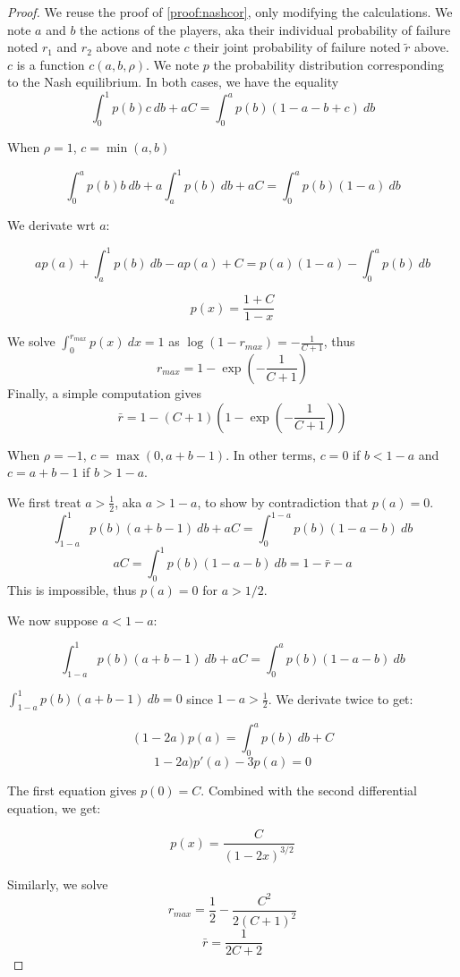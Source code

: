 \documentclass[preprint,12pt,authoryear,doubleblind]{elsarticle}
\theoremstyle{definition}
\begin{document}
\nashwithcor*
\begin{proof}
        We reuse the proof of \ref{proof:nashcor}, only modifying the calculations.
    We note $a$ and $b$ the actions of the players, aka their individual probability of failure noted $r_1$ and $r_2$ above and note $c$ their joint probability of failure noted $\tilde r$ above. $c$ is a function $c(a,b,\rho)$. We note $p$ the probability distribution corresponding to the Nash equilibrium.
    In both cases, we have the equality $$\int_0^1 p(b) c~db + a C = \int_0^a p(b)(1-a-b+c)~db$$

    When $\rho = 1$, $c = \min(a, b)$

    $$\int_0^a p(b) b~db + a \int_a^1 p(b)~db + a C = \int_0^a p(b)(1-a)~db$$

    We derivate wrt $a$:

    $$a p(a) + \int_a^1 p(b)~db - ap(a) + C = p(a)(1-a) - \int_0^a p(b)~db$$

    $$p(x) = \frac{1+C}{1-x}$$

    We solve $\int_0^{r_{max}} p(x)~dx=1$ as $\log(1-r_{max}) = -\frac{1}{C+1}$, thus
    $$r_{max} = 1 - \exp\left(-\frac{1}{C+1}\right)$$
    Finally, a simple computation gives $$\bar r = 1 - (C+1)\left(1-\exp\left(-\frac{1}{C+1}\right)\right)$$
    
    

    When $\rho = -1$, $c = \max(0, a+b-1)$. In other terms, $c=0$ if $b<1-a$ and $c=a+b-1$ if $b>1-a$.

    We first treat $a>\frac{1}{2}$, aka $a>1-a$, to show by contradiction that $p(a) = 0$.
    $$\int_{1-a}^1 p(b)(a+b-1)~db+ aC = \int_0^{1-a} p(b)(1-a-b)~db$$
    $$aC = \int_0^1 p(b)(1-a-b)~db = 1 - \bar r - a$$
    This is impossible, thus $p(a) = 0$ for $a> 1/2$.

    We now suppose $a < 1-a$:

    $$\int_{1-a}^1 p(b)(a+b-1)~db + aC = \int_0^a p(b) (1-a-b)~db$$

    $\int_{1-a}^1 p(b)(a+b-1)~db = 0$ since $1-a >  \frac12$.
    We derivate twice to get:

    $$(1-2a)p(a) = \int_0^a p(b)~db + C$$
    $$1-2a) p'(a) - 3p(a) = 0$$

    The first equation gives $p(0) = C$. Combined with the second differential equation, we get:

    $$p(x) =\frac{C}{(1-2x)^{3/2}}$$

    Similarly, we solve  $$r_{max} = \frac{1}{2} - \frac{C^2}{2(C+1)^2}$$
    $$\bar r = \frac{1}{2C+2}$$
\end{proof}
\end{document}
